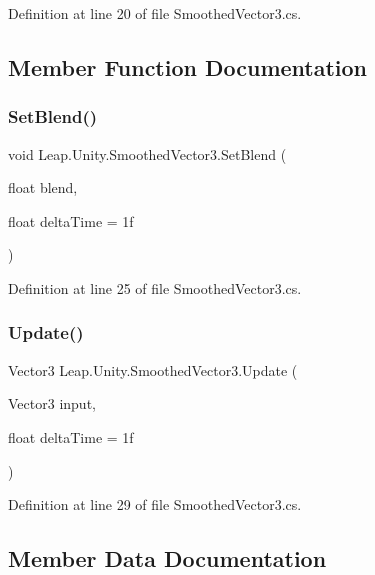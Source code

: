 Definition at line 20 of file Smoothed\+Vector3.\+cs.



\subsection{Member Function Documentation}
\mbox{\label{class_leap_1_1_unity_1_1_smoothed_vector3_abd7ed7dbce4be629367a82bfea2661cd}} 
\subsubsection{\texorpdfstring{SetBlend()}{SetBlend()}}
{\footnotesize\ttfamily void Leap.\+Unity.\+Smoothed\+Vector3.\+Set\+Blend (\begin{DoxyParamCaption}\item[{float}]{blend,  }\item[{float}]{delta\+Time = {\ttfamily 1f} }\end{DoxyParamCaption})}



Definition at line 25 of file Smoothed\+Vector3.\+cs.

\mbox{\label{class_leap_1_1_unity_1_1_smoothed_vector3_a2ee8eecdff94dfd862c61bae5f43e045}} 
\subsubsection{\texorpdfstring{Update()}{Update()}}
{\footnotesize\ttfamily Vector3 Leap.\+Unity.\+Smoothed\+Vector3.\+Update (\begin{DoxyParamCaption}\item[{Vector3}]{input,  }\item[{float}]{delta\+Time = {\ttfamily 1f} }\end{DoxyParamCaption})}



Definition at line 29 of file Smoothed\+Vector3.\+cs.



\subsection{Member Data Documentation}
\mbox{\label{class_leap_1_1_unity_1_1_smoothed_vector3_ad0c4115ffe93cefdde8d01d561833047}} 
